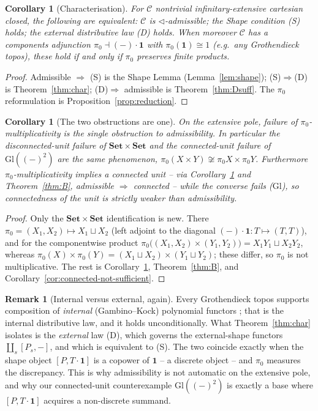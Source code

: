 \documentclass[11pt]{amsart}
\theoremstyle{plain}
\newtheorem{corollary}[theorem]{Corollary}
\theoremstyle{definition}
\newtheorem{remark}[theorem]{Remark}
\newcommand{\C}{\mathcal{C}}
\newcommand{\Setb}{\mathbf{Set}}
\newcommand{\Gl}{\mathrm{Gl}}
\newcommand{\comp}{\mathbin{\triangleleft}}
\newcommand{\one}{\mathbf{1}}
\newcommand{\pizero}{\pi_0}
\begin{document}
\begin{corollary}[Characterisation]\label{cor:char}
For $\C$ nontrivial infinitary-extensive cartesian closed, the following are equivalent:
$\C$ is $\comp$-admissible; the Shape condition \emph{(S)} holds; the external distributive law
\emph{(D)} holds. When moreover $\C$ has a components adjunction $\pizero\dashv(-)\cdot\one$ with
$\pizero(\one)\cong1$ (e.g.\ any Grothendieck topos), these hold if and only if $\pizero$ preserves
finite products.
\end{corollary}
\begin{proof}
Admissible $\Rightarrow$ (S) is the Shape Lemma (Lemma~\ref{lem:shape}); (S)$\Rightarrow$(D) is
Theorem~\ref{thm:char}; (D)$\Rightarrow$ admissible is Theorem~\ref{thm:Dsuff}. The $\pizero$
reformulation is Proposition~\ref{prop:reduction}.
\end{proof}

\begin{corollary}[The two obstructions are one]\label{cor:unif}
On the extensive pole, failure of $\pizero$-multiplicativity is the \emph{single} obstruction to
admissibility. In particular the disconnected-unit failure of $\Setb\times\Setb$ and the
connected-unit failure of $\Gl((-)^2)$ are the same phenomenon, $\pizero(X\times Y)\not\cong\pizero
X\times\pizero Y$. Furthermore $\pizero$-multiplicativity implies a connected unit -- via
Corollary~\ref{cor:char} and Theorem~\ref{thm:B}, admissible $\Rightarrow$ connected -- while the
converse fails ($\Gl$), so connectedness of the unit is strictly weaker than admissibility.
\end{corollary}
\begin{proof}
Only the $\Setb\times\Setb$ identification is new. There $\pizero=(X_1,X_2)\mapsto X_1\sqcup X_2$ (left
adjoint to the diagonal $(-)\cdot\one:T\mapsto(T,T)$), and for the componentwise product
$\pizero\big((X_1,X_2)\times(Y_1,Y_2)\big)=X_1Y_1\sqcup X_2Y_2$, whereas
$\pizero(X)\times\pizero(Y)=(X_1\sqcup X_2)\times(Y_1\sqcup Y_2)$; these differ, so $\pizero$ is not
multiplicative. The rest is Corollary~\ref{cor:char}, Theorem~\ref{thm:B}, and
Corollary~\ref{cor:connected-not-sufficient}.
\end{proof}

\begin{remark}[Internal versus external, again]\label{rem:char-internal}
Every Grothendieck topos supports composition of \emph{internal} (Gambino--Kock) polynomial functors
\cite{GambinoKock}; that is the internal distributive law, and it holds unconditionally. What
Theorem~\ref{thm:char} isolates is the \emph{external} law (D), which governs the external-shape
functors $\coprod_s[P_s,-]$, and which is equivalent to (S). The two coincide exactly when the shape
object $[P,T\cdot\one]$ is a copower of $\one$ -- a discrete object -- and $\pizero$ measures the
discrepancy. This is why admissibility is not automatic on the extensive pole, and why our
connected-unit counterexample $\Gl((-)^2)$ is exactly a base where $[P,T\cdot\one]$ acquires a
non-discrete summand.
\end{remark}
\end{document}
